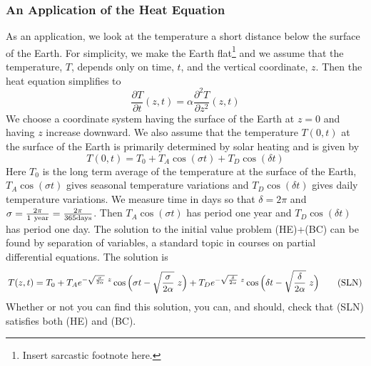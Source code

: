 \subsubsection{An Application of the Heat Equation}
As an application, we look at the temperature a short distance 
below the surface of the Earth. For simplicity, we make the Earth 
flat\footnote{Insert sarcastic footnote here.}
and we assume that the temperature, $T$, depends only on time, $t$, and 
the vertical coordinate, $z$. Then the heat equation simplifies to
\begin{equation}
\frac{\partial T}{\partial t}(z,t)
=\alpha \frac{\partial^2 T}{\partial z^2}(z,t)
\tag{HE}\end{equation}
We choose a coordinate system having the
surface of the Earth at $z=0$ and having $z$ increase downward.
We also assume that the temperature $T(0,t)$ at the surface of the Earth
is primarily determined by solar heating and is given by
\begin{equation}
T(0,t)=T_0+T_A\cos(\sigma t)+T_D\cos(\delta t)
\tag{BC}\end{equation}
Here $T_0$ is the long term
average of the temperature at the surface of the Earth, 
$T_A\cos(\sigma t)$ gives seasonal temperature variations and 
$T_D\cos(\delta t)$ gives daily temperature variations.%
We measure time in days so that 
$\delta =2\pi$ and 
$\sigma =\frac{2\pi}{1\ {\rm year}}=\frac{2\pi}{365{\rm days}}$.
Then $T_A\cos(\sigma t)$ has period one year and 
$T_D\cos(\delta t)$ has period one day.
The solution to the initial value problem (HE)+(BC) can be found by separation
of variables, a standard topic in courses on partial differential equations.
The solution is
\begin{equation}
T(z,t)=T_0
+T_Ae^{-\sqrt{\sigma \over 2\alpha}\ z}
     \cos\Big(\sigma t-\sqrt{\frac{\sigma }{2\alpha}}\ z\Big)
+T_De^{-\sqrt{\delta \over 2\alpha}\ z}
 \cos\Big(\delta t-\sqrt{\frac{\delta }{2\alpha}}\ z\Big)
\tag{SLN}\end{equation}
Whether or not you can find this solution, 
you can, and should, check that (SLN) satisfies both (HE) and (BC). 

